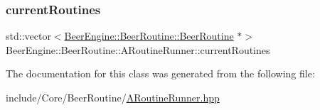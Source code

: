 \subsubsection{\texorpdfstring{current\+Routines}{currentRoutines}}
{\footnotesize\ttfamily std\+::vector$<$\mbox{\hyperlink{class_beer_engine_1_1_beer_routine_1_1_beer_routine}{Beer\+Engine\+::\+Beer\+Routine\+::\+Beer\+Routine}} $\ast$$>$ Beer\+Engine\+::\+Beer\+Routine\+::\+A\+Routine\+Runner\+::current\+Routines}



The documentation for this class was generated from the following file\+:\begin{DoxyCompactItemize}
\item 
include/\+Core/\+Beer\+Routine/\mbox{\hyperlink{_a_routine_runner_8hpp}{A\+Routine\+Runner.\+hpp}}\end{DoxyCompactItemize}
